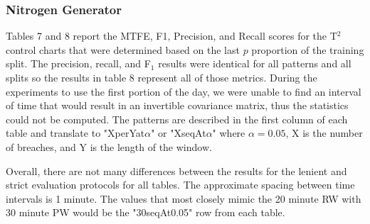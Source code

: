 \documentclass[12pt]{article}
\begin{document}
\clearpage
\subsubsection{Nitrogen Generator}

Tables 7 and 8 report the MTFE, F1, Precision, and Recall scores for the T$^2$ control charts that were determined based on the
last $p$ proportion of the training split. The precision, recall, and F$_1$ results were identical for all patterns and all splits
so the results in table 8 represent all of those metrics. During the experiments to use the first portion of the day, we were unable
to find an interval of time that would result in an invertible covariance matrix, thus the statistics could not be computed.
The patterns are described in the first column of each table
and translate to "XperYat$\alpha$" or "XseqAt$\alpha$" where $\alpha=0.05$, X is the number of breaches, and Y is the length
of the window.

Overall, there are not many differences between the results for the lenient and strict evaluation protocols for all tables.
The approximate spacing between time intervals is 1 minute. The values that most closely mimic the 20 minute RW with 30
minute PW would be the "30seqAt0.05" row from each table.
\end{document}
